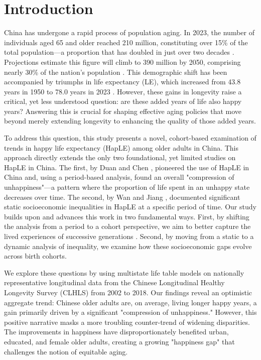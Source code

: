 \documentclass[12pt, a4paper]{article}
\begin{document}
\newpage
\section{Introduction}
China has undergone a rapid process of population aging. In 2023, the number of individuals aged 65 and older reached 210 million, constituting over 15\% of the total population—a proportion that has doubled in just over two decades \autocite{nationalbureauofstatisticsofchina.2023.china}. Projections estimate this figure will climb to 390 million by 2050, comprising nearly 30\% of the nation's population \autocite{unitednations.2024.world}. This demographic shift has been accompanied by triumphs in life expectancy (LE), which increased from 43.8 years in 1950 to 78.0 years in 2023 \autocite{unitednations.2024.world}. However, these gains in longevity raise a critical, yet less understood question: are these added years of life also happy years? Answering this is crucial for shaping effective aging policies that move beyond merely extending longevity to enhancing the quality of those added years.

To address this question, this study presents a novel, cohort-based examination of trends in happy life expectancy (HapLE) among older adults in China. This approach directly extends the only two foundational, yet limited studies on HapLE in China. The first, by Duan and Chen \autocite{duan.2020.happy}, pioneered the use of HapLE in China and, using a period-based analysis, found an overall "compression of unhappiness"—a pattern where the proportion of life spent in an unhappy state decreases over time. The second, by Wan and Jiang \autocite{wan.2024.socioeconomic}, documented significant static socioeconomic inequalities in HapLE at a specific period of time. Our study builds upon and advances this work in two fundamental ways. First, by shifting the analysis from a period to a cohort perspective, we aim to better capture the lived experiences of successive generations \autocite{payne.2022.expansion}. Second, by moving from a static to a dynamic analysis of inequality, we examine how these socioeconomic gaps evolve across birth cohorts.

We explore these questions by using multistate life table models on nationally representative longitudinal data from the Chinese Longitudinal Healthy Longevity Survey (CLHLS) from 2002 to 2018. Our findings reveal an optimistic aggregate trend: Chinese older adults are, on average, living longer happy years, a gain primarily driven by a significant "compression of unhappiness." However, this positive narrative masks a more troubling counter-trend of widening disparities. The improvements in happiness have disproportionately benefited urban, educated, and female older adults, creating a growing "happiness gap" that challenges the notion of equitable aging.
\end{document}
